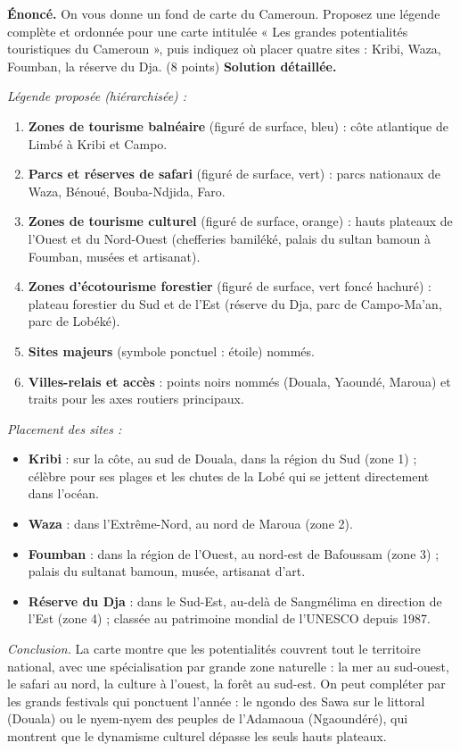 \documentclass[11pt]{article}
\begin{document}
\begin{exoresolu}
\textbf{Énoncé.} On vous donne un fond de carte du Cameroun. Proposez une légende complète et ordonnée pour une carte intitulée « Les grandes potentialités touristiques du Cameroun », puis indiquez où placer quatre sites : Kribi, Waza, Foumban, la réserve du Dja. (8 points)
\tcblower
\textbf{Solution détaillée.}

\emph{Légende proposée (hiérarchisée) :}
\begin{enumerate}
\item \textbf{Zones de tourisme balnéaire} (figuré de surface, bleu) : côte atlantique de Limbé à Kribi et Campo.
\item \textbf{Parcs et réserves de safari} (figuré de surface, vert) : parcs nationaux de Waza, Bénoué, Bouba-Ndjida, Faro.
\item \textbf{Zones de tourisme culturel} (figuré de surface, orange) : hauts plateaux de l'Ouest et du Nord-Ouest (chefferies bamiléké, palais du sultan bamoun à Foumban, musées et artisanat).
\item \textbf{Zones d'écotourisme forestier} (figuré de surface, vert foncé hachuré) : plateau forestier du Sud et de l'Est (réserve du Dja, parc de Campo-Ma'an, parc de Lobéké).
\item \textbf{Sites majeurs} (symbole ponctuel : étoile) nommés.
\item \textbf{Villes-relais et accès} : points noirs nommés (Douala, Yaoundé, Maroua) et traits pour les axes routiers principaux.
\end{enumerate}

\emph{Placement des sites :}
\begin{itemize}
\item \textbf{Kribi} : sur la côte, au sud de Douala, dans la région du Sud (zone 1) ; célèbre pour ses plages et les chutes de la Lobé qui se jettent directement dans l'océan.
\item \textbf{Waza} : dans l'Extrême-Nord, au nord de Maroua (zone 2).
\item \textbf{Foumban} : dans la région de l'Ouest, au nord-est de Bafoussam (zone 3) ; palais du sultanat bamoun, musée, artisanat d'art.
\item \textbf{Réserve du Dja} : dans le Sud-Est, au-delà de Sangmélima en direction de l'Est (zone 4) ; classée au patrimoine mondial de l'UNESCO depuis 1987.
\end{itemize}

\emph{Conclusion.} La carte montre que les potentialités couvrent tout le territoire national, avec une spécialisation par grande zone naturelle : la mer au sud-ouest, le safari au nord, la culture à l'ouest, la forêt au sud-est. On peut compléter par les grands festivals qui ponctuent l'année : le ngondo des Sawa sur le littoral (Douala) ou le nyem-nyem des peuples de l'Adamaoua (Ngaoundéré), qui montrent que le dynamisme culturel dépasse les seuls hauts plateaux.
\end{exoresolu}
\end{document}
